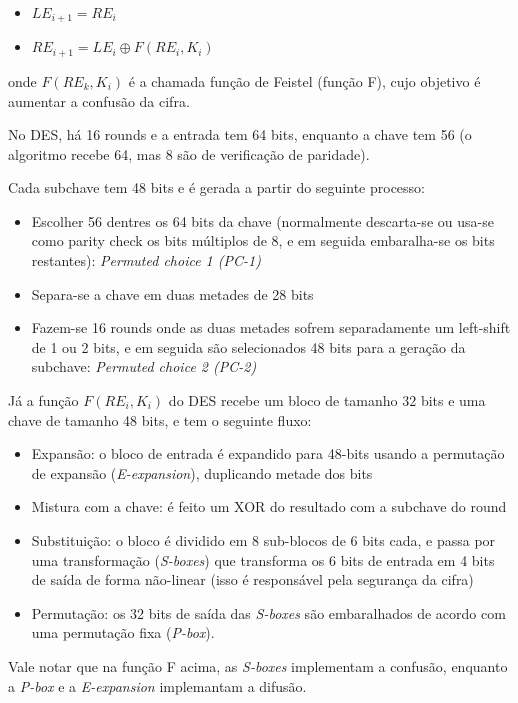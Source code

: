 \documentclass{article}
\begin{document}
\begin{itemize}
    \item $LE_{i+1} = RE_i$
    \item $RE_{i+1} = LE_i \oplus F(RE_i, K_i)$
\end{itemize}

onde $F(RE_k, K_i)$ é a chamada função de Feistel (função F), cujo objetivo é aumentar a confusão da cifra.

No DES, há 16 rounds e a entrada tem 64 bits, enquanto a chave tem 56 (o algoritmo recebe 64, mas 8 são de verificação de paridade).

Cada subchave tem 48 bits e é gerada a partir do seguinte processo:

\begin{itemize}
    \item Escolher 56 dentres os 64 bits da chave (normalmente descarta-se ou usa-se como parity check os bits múltiplos de 8, e em seguida embaralha-se os bits restantes): \textit{Permuted choice 1 (PC-1)}
    \item Separa-se a chave em duas metades de 28 bits
    \item Fazem-se 16 rounds onde as duas metades sofrem separadamente um left-shift de 1 ou 2 bits, e em seguida são selecionados 48 bits para a geração da subchave: \textit{Permuted choice 2 (PC-2)}
\end{itemize}

Já a função $F(RE_i, K_i)$ do DES recebe um bloco de tamanho 32 bits e uma chave de tamanho 48 bits, e tem o seguinte fluxo:

\begin{itemize}
    \item Expansão: o bloco de entrada é expandido para 48-bits usando a permutação de expansão (\textit{E-expansion}), duplicando metade dos bits
    \item Mistura com a chave: é feito um XOR do resultado com a subchave do round
    \item Substituição: o bloco é dividido em 8 sub-blocos de 6 bits cada, e passa por uma transformação (\textit{S-boxes}) que transforma os 6 bits de entrada em 4 bits de saída de forma não-linear (isso é responsável pela segurança da cifra)
    \item Permutação: os 32 bits de saída das \textit{S-boxes} são embaralhados de acordo com uma permutação fixa (\textit{P-box}).
\end{itemize}

Vale notar que na função F acima, as \textit{S-boxes} implementam a confusão, enquanto a \textit{P-box} e a \textit{E-expansion} implemantam a difusão.
\end{document}
